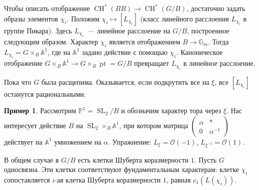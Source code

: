 \documentclass[a4paper]{article}
\DeclareMathOperator{\SL}{SL}
\DeclareMathOperator{\CH}{CH}
\DeclareMathOperator{\pt}{pt}
\theoremstyle{definition}
\newtheorem{example}[theorem]{Пример}
\begin{document}
Чтобы описать отображение $\CH^*(BB) \to \CH^*(G/B)$,
достаточно задать образы элементов $\chi_i$.
Положим $\chi_i\mapsto [L_{\chi_i}]$ (класс линейного
расслоения $L_{\chi_i}$ в группе Пикара).
Здесь $L_{\chi_i}$~--- линейное расслоение на $G/B$,
построенное следующим образом.
Характер $\chi_i$ является отображением
$B\to \mathbb{G}_m$.
Тогда $L_{\chi_i} = G\times_{B}\mathbb{A}^1$,
где на $\mathbb{A}^1$ задано действие с помощью $\chi_i$.
Каноническое отображение
$G\times_{B}\mathbb{A}^1 \to G\times_{B}\pt = G/B$
превращает $L_{\chi_i}$ в линейное расслоение.

Пока что $G$ была расщепима.
Оказывается, если подкрутить все на $\xi$, все
$[L_{\chi_i}]$ останутся рациональными.

\begin{example}
Рассмотрим $\mathbb{P}^1 = \SL_2/B$ и обозначим
характер тора через $\xi$.
Нас интересует действие $B$ на $\SL_2\times_{B}\mathbb{A}^1$,
при котором
матрица $\begin{pmatrix}\alpha & * \\ 0 & \alpha^{-1}\end{pmatrix}$
действует на $\mathbb{A}^1$ умножением на $\alpha$.
Упражнение: $L_{\xi} = \mathcal{O}(-1)$,
$L_{\xi^{-1}} = \mathcal{O}(1)$.

В общем случае в $G/B$ есть клетки Шуберта коразмерности $1$.
Пусть $G$ односвязна.
Эти клетки соответствуют фундаментальным характерам:
клетке $\chi_i$ сопоставляется $i$-ая клетка Шуберта
коразмерности $1$, равная $c_1(L(\chi_i))$.
\end{example}
\end{document}
